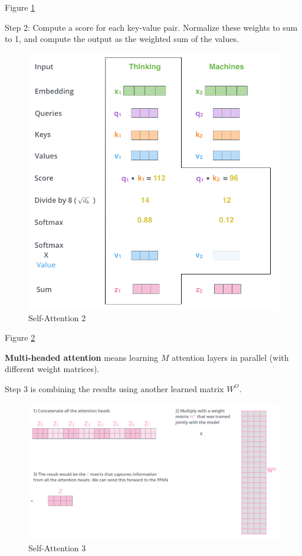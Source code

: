 \documentclass[english]{article}
\begin{document}
\item  Figure \ref{Self-Attention 2}

Step 2: Compute a score for each key-value pair. Normalize these weights to sum to 1, and compute the output as the weighted sum of the values.
\begin{figure}
\centering
\includegraphics[height=0.55\linewidth]{self-attention2.png}
    \caption{Self-Attention 2}
    \label{Self-Attention 2}
\end{figure}
 

\item  Figure \ref{Self-Attention 3}

\textbf{Multi-headed attention} means learning $M$ attention layers in parallel (with different weight matrices).

Step 3 is combining the results using another learned matrix $W^O$.
\begin{figure}
\centering
\includegraphics[width=1\linewidth]{self-attention3.png}
    \caption{Self-Attention 3}
    \label{Self-Attention 3}
\end{figure} 
 
\end{document}
